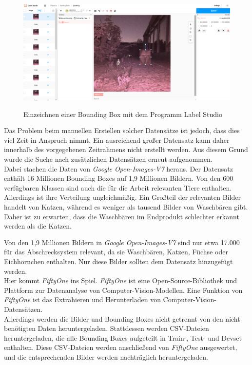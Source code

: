 \begin{figure}[H]
    \centering
    \includegraphics[width=\textwidth]{images/label_studio.png}
    \label{fig:label_studio}
    \caption{Einzeichnen einer Bounding Box mit dem Programm Label Studio}
\end{figure}

Das Problem beim manuellen Erstellen solcher Datensätze ist jedoch, dass dies viel Zeit in Anspruch nimmt. Ein ausreichend großer Datensatz kann daher innerhalb des vorgegebenen Zeitrahmens nicht erstellt werden. Aus diesem Grund wurde die Suche nach zusätzlichen Datensätzen erneut aufgenommen.
\\
Dabei stachen die Daten von \textit{Google Open-Images-V7} heraus. Der Datensatz enthält 16 Millionen Bounding Boxes auf 1,9 Millionen Bildern. Von den 600 verfügbaren Klassen sind auch die für die Arbeit relevanten Tiere enthalten. Allerdings ist ihre Verteilung ungleichmäßig. Ein Großteil der relevanten Bilder handelt von Katzen, während es weniger als tausend Bilder von Waschbären gibt. Daher ist zu erwarten, dass die Waschbären im Endprodukt schlechter erkannt werden als die Katzen. \cite{google_oi7}

Von den 1,9 Millionen Bildern in \textit{Google Open-Images-V7} sind nur etwa 17.000 für das Abschrecksystem relevant, da sie Waschbären, Katzen, Füchse oder Eichhörnchen enthalten. Nur diese Bilder sollten dem Datensatz hinzugefügt werden.
\\
Hier kommt \textit{FiftyOne} ins Spiel. \textit{FiftyOne} ist eine Open-Source-Bibliothek und Plattform zur Datenanalyse von Computer-Vision-Modellen. Eine Funktion von \textit{FiftyOne} ist das Extrahieren und Herunterladen von Computer-Vision-Datensätzen.
\\
Allerdings werden die Bilder und Bounding Boxes nicht getrennt von den nicht benötigten Daten heruntergeladen. Stattdessen werden CSV-Dateien heruntergeladen, die alle Bounding Boxes aufgeteilt in Train-, Test- und Devset enthalten. Diese CSV-Dateien werden anschließend von \textit{FiftyOne} ausgewertet, und die entsprechenden Bilder werden nachträglich heruntergeladen. \cite{fiftyone}


